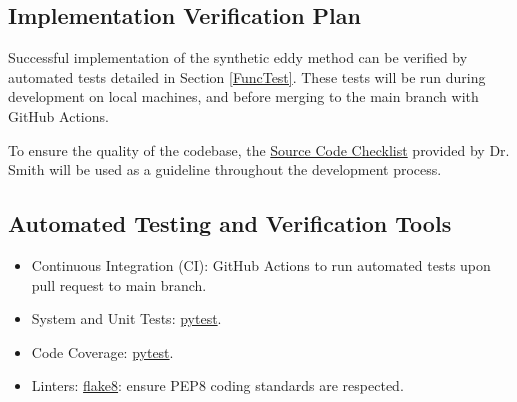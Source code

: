 \documentclass[12pt, titlepage]{article}
\begin{document}



\subsection{Implementation Verification Plan}

Successful implementation of the synthetic eddy method can be verified by automated tests detailed in Section \ref{FuncTest}. These tests will be run during development on local machines, and before merging to the main branch with GitHub Actions.

To ensure the quality of the codebase, the \href{https://github.com/omltcat/turbulent-flow/blob/main/docs/Checklists/Code-Checklist.pdf}{Source Code Checklist} provided by Dr. Smith will be used as a guideline throughout the development process. 



\subsection{Automated Testing and Verification Tools}

\begin{itemize}
  \item Continuous Integration (CI): GitHub Actions to run automated tests upon pull request to main branch.
  \item System and Unit Tests: \href{https://docs.pytest.org/}{pytest}.
  \item Code Coverage: \href{https://docs.pytest.org/}{pytest}.
  \item Linters: \href{https://marketplace.visualstudio.com/items?itemName=ms-python.flake8}{flake8}: ensure PEP8 coding standards are respected.
\end{itemize}

\end{document}
